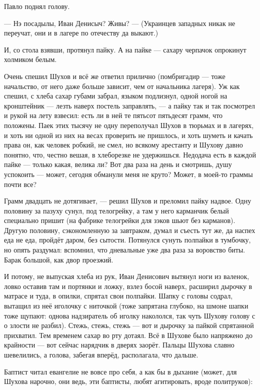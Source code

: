 Павло поднял голову.

--- Нэ посадылы, Иван Денисыч? Живы? --- (Украинцев западных никак не переучат, они и в лагере по 
отечеству да выкают.)

И, со стола взявши, протянул пайку. А на пайке --- сахару черпачок опрокинут холмиком белым.

Очень спешил Шухов и всё же ответил прилично (помбригадир --- тоже начальство, от него даже 
больше зависит, чем от начальника лагеря). Уж как спешил, с хлеба сахар губами забрал, языком 
подлизнул, одной ногой на кронштейник --- лезть наверх постель заправлять, --- а пайку так и так 
посмотрел и рукой на лету взвесил: есть ли в ней те пятьсот пятьдесят грамм, что положены. 
Паек этих тысячу не одну переполучал Шухов в тюрьмах и в лагерях, и хоть ни одной из них на 
весах проверить не пришлось, и хоть шуметь и качать права он, как человек робкий, не смел, но 
всякому арестанту и Шухову давно понятно, что, честно вешая, в хлеборезке не удержишься. 
Недодача есть в каждой пайке --- только какая, велика ли? Вот два раза на день и смотришь, душу 
успокоить --- может, сегодня обманули меня не круто? Может, в моей-то граммы почти все?

Грамм двадцать не дотягивает, --- решил Шухов и преломил пайку надвое. Одну половину за пазуху 
сунул, под телогрейку, а там у него карманчик белый специально пришит (на фабрике телогрейки 
для зэков шьют без карманов). Другую половину, сэкономленную за завтраком, думал и съесть тут 
же, да наспех еда не еда, пройдёт даром, без сытости. Потянулся сунуть полпайки в тумбочку, но 
опять раздумал: вспомнил, что дневальные уже два раза за воровство биты. Барак большой, как 
двор проезжий.

И потому, не выпуская хлеба из рук, Иван Денисович вытянул ноги из валенок, ловко оставив там 
и портянки и ложку, взлез босой наверх, расширил дырочку в матрасе и туда, в опилки, спрятал 
свои полпайки. Шапку с головы содрал, вытащил из неё иголочку с ниточкой (тоже запрятана 
глубоко, на шмоне шапки тоже щупают: однова надзиратель об иголку накололся, так чуть Шухову 
голову с о злости не разбил). Стежь, стежь, стежь --- вот и дырочку за пайкой спрятанной 
прихватил. Тем временем сахар во рту дотаял. Всё в Шухове было напряжено до крайности --- вот 
сейчас нарядчик в дверях заорёт. Пальцы Шухова славно шевелились, а голова, забегая вперёд, 
располагала, что дальше.

Баптист читал евангелие не вовсе про себя, а как бы в дыхание (может, для Шухова нарочно, они 
ведь, эти баптисты, любят агитировать, вроде политруков):

